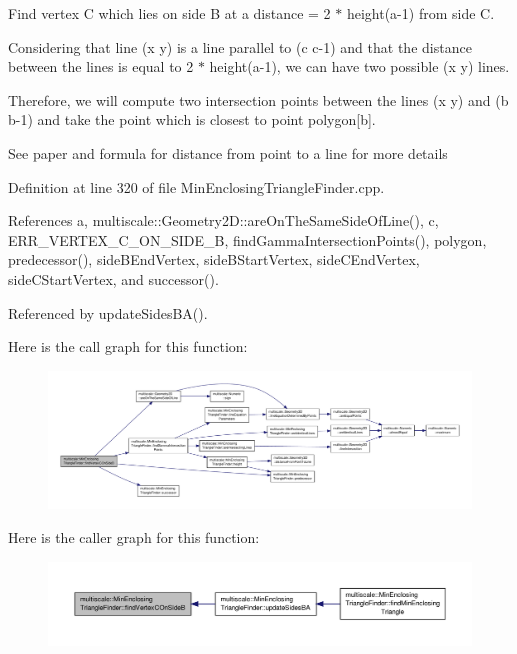 Find vertex C which lies on side B at a distance = 2 $\ast$ height(a-\/1) from side C. 

Considering that line (x y) is a line parallel to (c c-\/1) and that the distance between the lines is equal to 2 $\ast$ height(a-\/1), we can have two possible (x y) lines.

Therefore, we will compute two intersection points between the lines (x y) and (b b-\/1) and take the point which is closest to point polygon\mbox{[}b\mbox{]}.

See paper and formula for distance from point to a line for more details 

Definition at line 320 of file Min\-Enclosing\-Triangle\-Finder.\-cpp.



References a, multiscale\-::\-Geometry2\-D\-::are\-On\-The\-Same\-Side\-Of\-Line(), c, E\-R\-R\-\_\-\-V\-E\-R\-T\-E\-X\-\_\-\-C\-\_\-\-O\-N\-\_\-\-S\-I\-D\-E\-\_\-\-B, find\-Gamma\-Intersection\-Points(), polygon, predecessor(), side\-B\-End\-Vertex, side\-B\-Start\-Vertex, side\-C\-End\-Vertex, side\-C\-Start\-Vertex, and successor().



Referenced by update\-Sides\-B\-A().



Here is the call graph for this function\-:\nopagebreak
\begin{figure}[H]
\begin{center}
\leavevmode
\includegraphics[width=350pt]{classmultiscale_1_1MinEnclosingTriangleFinder_ab0b488d2d67f2d22077777eebc292c1a_cgraph}
\end{center}
\end{figure}




Here is the caller graph for this function\-:\nopagebreak
\begin{figure}[H]
\begin{center}
\leavevmode
\includegraphics[width=350pt]{classmultiscale_1_1MinEnclosingTriangleFinder_ab0b488d2d67f2d22077777eebc292c1a_icgraph}
\end{center}
\end{figure}


